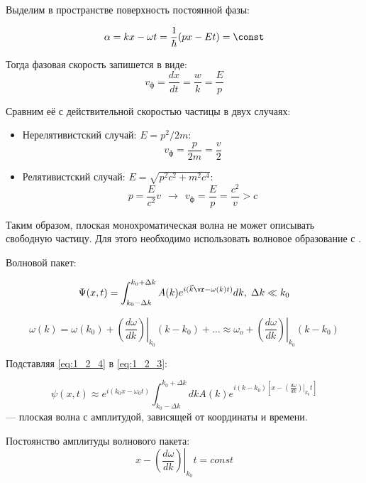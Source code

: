 Выделим в пространстве поверхность постоянной фазы:

$$\alpha = k x - \omega t = \frac{1}{\hbar} (px - Et) = \const$$

Тогда фазовая скорость запишется в виде:
\begin{equation}
\label{eq:1_2_2}
v_{\text{ф}} = \frac{dx}{dt} = \frac{w}{k} = \frac{E}{p}
\end{equation}

Сравним её с действительной скоростью частицы в двух случаях:

\begin{itemize}
\item Нерелятивистский случай: $E = p^2/{2m}$:  $$v_{\text{ф}} = \frac{p}{2m} = \frac{v}{2}$$
\item  Релятивистский случай: $E = \sqrt{p^2c^2 + m^2c^4}$: $$p = \frac{E}{c^2}v~~\rightarrow~~v_{\text{ф}} = \frac{E}{p} = \frac{c^2}{v} > c$$
\end{itemize}

Таким образом, плоская монохроматическая волна  не может описывать свободную частицу. Для этого необходимо использовать волновое образование с .

Волновой пакет:

\begin{equation}
\label{eq:1_2_3}
\Psi(x,t) = \int^{k_0 + \Delta k}_{k_0 - \Delta k} A(k)e^{i(\vec{k}\vr - \omega (k) t)} dk, \; \Delta k\ll k_0
\end{equation}

\begin{equation}
\label{eq:1_2_4}
\omega (k) = \omega (k_0) + \left. \left ( \frac{d \omega}{dk} \right ) \right |_{k_0} (k-k_0) + \ldots \approx \omega_o +  \left. \left ( \frac{d \omega}{dk} \right ) \right |_{k_0} (k-k_0)
\end{equation}

Подставляя \eqref{eq:1_2_4} в \eqref{eq:1_2_3}:

\begin{equation}
\label{eq:1_2_5}
\psi(x,t) \approx e^{i(k_0 x - \omega_0 t) }\int^{k_0 + \Delta k}_{k_0 - \Delta k} dk A(k)e^{i(k - k_0) \left [ x - \left . \left ( \frac{d\omega}{dk} \right ) \right |_{k_0} t \right ]}
\end{equation}
--- плоская волна с амплитудой, зависящей от координаты и времени.

Постоянство амплитуды волнового пакета:
\begin{equation}
\label{eq:1_2_6}
x - \left . \left ( \frac{d\omega}{dk} \right ) \right |_{k_0} t = const
\end{equation}


